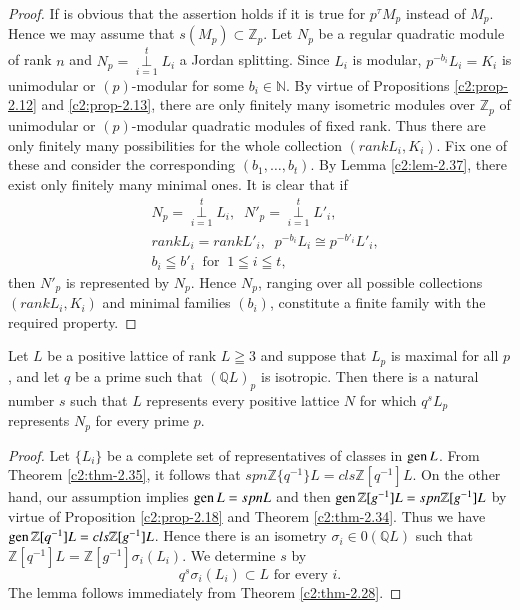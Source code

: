 \begin{proof}
If is obvious that the assertion holds if it is true for $p^{\tau}M_p$
instead of $M_p$. Hence we may assume that
$s(M_p) \subset \mathbb{Z}_p$. Let $N_p$ be a regular quadratic module
of rank $n$ and $N_p =\mathop{\perp}\limits^t_{i=1} L_i$ a Jordan
splitting. Since $L_i$ is modular, $p^{-b_i} L_i =K_i$\pageoriginale
is unimodular or $(p)$-modular for some
$b_i \in \mathbb{N}$. By virtue of Propositions \ref{c2:prop-2.12} and \ref{c2:prop-2.13},
there are only finitely many isometric modules over $\mathbb{Z}_p$ of
unimodular or $(p)$-modular quadratic modules of fixed rank. Thus
there are only finitely many possibilities for the whole collection
$(rank L_i, K_i)$. Fix one of these and consider the corresponding
$(b_1, \ldots, b_t)$. By Lemma \ref{c2:lem-2.37}, there exist only finitely many
minimal ones. It is clear that if 
\begin{align*}
&N_p=\mathop{\perp}\limits^t_{i=1} L_i, \;\; N'_p
= \mathop{\perp}\limits^t_{i=1} L'_i,\\  
&rank L_i = rank
L'_i, \;\; p^{-b_i} L_i \cong p^{-b'_i} L'_i,\\
&b_i \leqq b'_i \;\; \text{for} \;\; 1\leqq i \leqq t, 
\end{align*}
then $N'_p$ is represented by $N_p$. Hence $N_p$, ranging over all
possible collections $(rank L_i, K_i)$ and minimal families $(b_i)$,
constitute a finite family with the required property.
\end{proof}

\begin{lemma}\label{c2:lem-2.39}
Let $L$ be a positive lattice of rank $L \geqq 3$ and suppose that
$L_p$ is maximal for all $p$, and let $q$ be a prime such that
$(\mathbb{Q}L)_p$ is isotropic. Then there is a natural number $s$
such that $L$ represents every positive lattice $N$ for which $q^sL_p$
represents $N_p$ for every prime $p$.
\end{lemma}

\begin{proof}
Let $\{L_i\}$ be a complete set of representatives of classes in $\operatorname{gen}
L$. From Theorem \ref{c2:thm-2.35}, it follows that $spn \mathbb{Z}\{q^{-1}\} L =
cls \mathbb{Z}[q^{-1}] L$. On the other hand, our assumption implies
$\operatorname{gen} L=spn L$ and then $\gen \mathbb{Z}[g^{-1}]\break L=spn \mathbb{Z}
[g^{-1}]L$ by virtue of Proposition \ref{c2:prop-2.18} and Theorem
\ref{c2:thm-2.34}. Thus we 
have $\operatorname{gen} \mathbb{Z}[q^{-1}] L = cls \mathbb{Z}[g^{-1}]L$. Hence
there is an isometry $\sigma_i \in 0(\mathbb{Q}L)$ such that
$\mathbb{Z}[q^{-1}] L=\mathbb{Z}[g^{-1}]\sigma_i(L_i)$. We determine
$s$ by
$$
q^s \sigma_i(L_i) \subset L \text{ for every } i.
$$
The lemma follows immediately from Theorem \ref{c2:thm-2.28}.
\end{proof}

